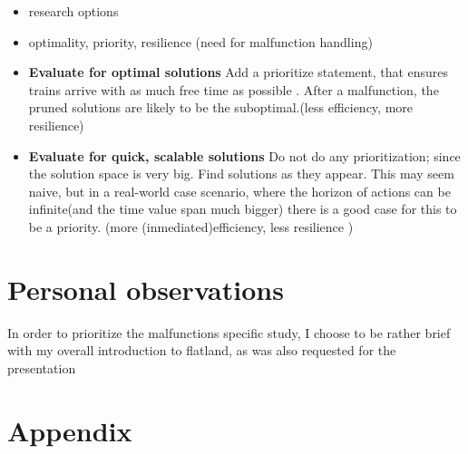 \documentclass{llncs}
\begin{document}
\color{green}
\begin{itemize}
	\item research options
	\item optimality, priority, resilience (need for malfunction handling)
\end{itemize}
\color{black}
\color{green}
\begin{itemize}
	\item  \textbf{Evaluate for optimal solutions} Add a prioritize statement, that ensures trains arrive with as much free time as possible . After a malfunction, the pruned solutions are likely to be the suboptimal.(less efficiency, more resilience)
	\item  \textbf{Evaluate for quick, scalable solutions} Do not do any prioritization; since the solution space is very big. Find solutions as they appear. This may seem naive, but in a real-world case scenario, where the horizon of actions can be infinite(and the time value span much bigger)  there is a good case for this to be a priority. (more (inmediated)efficiency, less resilience )
\end{itemize}
\color{black}


\section{Personal observations}
In order to prioritize the malfunctions specific study, I choose to be rather brief with my overall introduction to flatland, as was also requested for the presentation



{}


\appendix
\clearpage
\section{Appendix}
\label{sec:appendix}
\end{document}
